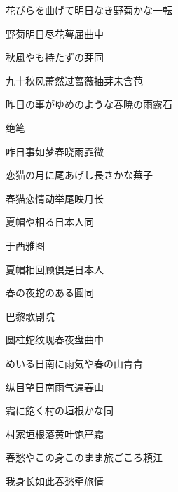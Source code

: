 \begin{haiku}
    {\FH 花びらを曲げて明日なき野菊かな}\hfill{\FH 一転}

    {\FK 野菊明日尽花萼屈曲中}
\end{haiku}

\begin{haiku}
    {\FH 秋風やも持たずの芽}\hfill{\FH 同}

    {\FK 九十秋风萧然过蔷薇抽芽未含苞}
\end{haiku}

\begin{haiku}
    {\FH 昨日の事がゆめのような春暁の雨}\hfill{\FH 露石}

    {\FK 绝笔}

    {\FK 咋日事如梦春晓雨霏微}
\end{haiku}

\begin{haiku}
    {\FH 恋猫の月に尾あげし長さかな}\hfill{\FH 蕪子}

    {\FK 春猫恋情动举尾映月长}
\end{haiku}

\begin{haiku}
    {\FH 夏帽や相る日本人}\hfill{\FH 同}

    {\FK 于西雅图}

    {\FK 夏帽相回顾倶是日本人}
\end{haiku}

\begin{haiku}
    {\FH 春の夜蛇のある圓}\hfill{\FH 同}

    {\FK 巴黎歌剧院}

    {\FK 圆柱蛇纹现春夜盘曲中}
\end{haiku}

\begin{haiku}
    {\FH {}めいる日南に雨気や春の山}\hfill{\FH 青青}

    {\FK 纵目望日南雨气遍春山}
\end{haiku}

\begin{haiku}
    {\FH 霜に飽く村の垣根かな}\hfill{\FH 同}

    {\FK 村家垣根落黄叶饱严霜}
\end{haiku}

\begin{haiku}
    {\FH 春愁やこの身このまま旅ごころ}\hfill{\FH 頼江}

    {\FK 我身长如此春愁牵旅情}
\end{haiku}

